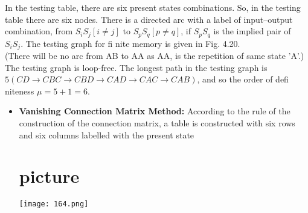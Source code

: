\documentclass[10pt]{article}
\begin{document}
\vspace*{0.3cm}

\begin{multicols}{2}
In the testing table, there are six present states combinations. So, in the testing table there are six
nodes. There is a directed arc with a label of
input–output combination, from $S_iS_j [i \neq j]$ to $S_pS_q
[p \neq q]$, if $S_pS_q$ is the implied pair of $S_iS_j$. The testing
graph for fi nite memory is given in Fig. 4.20.\\
\hspace*{0.5cm} (There will be no arc from AB to AA as AA, is
the repetition of same state 'A'.)\\
\hspace{0.5cm} The testing graph is loop-free. The longest
path in the testing graph is $5 (CD \rightarrow C BC \rightarrow C BD
\rightarrow C AD \rightarrow C AC \rightarrow C AB)$, and so the order of defi niteness
$\mu = 5 + 1 = 6.$\\
\begin{itemize}
  \item \textbf{Vanishing Connection Matrix Method:} According
to the rule of the construction of the connection
matrix, a table is constructed with six rows
and six columns labelled with the present state\\

\section{picture}
\texttt{[image: 164.png]}

\end{itemize}
\end{multicols}
\end{document}
